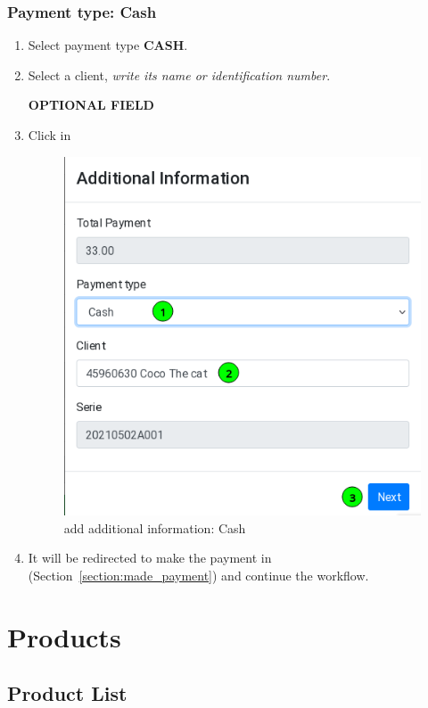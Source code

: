 \documentclass[a4paper,11pt]{refart}
\begin{document}
\subsubsection{Payment type: Cash}
\begin{enumerate}
	\item Select payment type \textbf{CASH}.
	\item Select a client, \emph{write its name or identification number}.
	\medskip
	\begin{leftbar}
		\textbf{OPTIONAL FIELD}
	\end{leftbar}
	\item Click in  	
	\medskip
	\begin{figure}[H]\centering
		\includegraphics[width=\textwidth]{images/sellinvoice-6}
		\caption{add additional information: Cash}\label{fig:sellinvoice-6}
	\end{figure}
	\item It will be redirected to make the payment in  (Section~\ref{section:made_payment}) and continue the workflow.
\end{enumerate}
\section{Products}
\subsection{Product List}\label{section:product_list}
\end{document}
